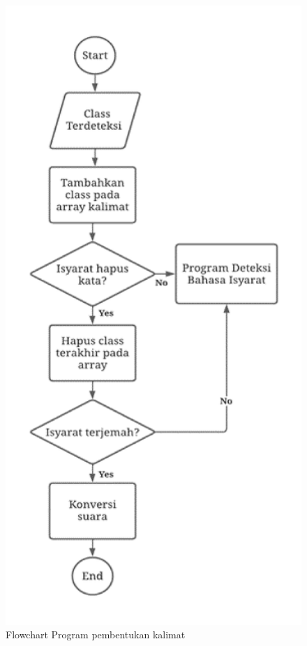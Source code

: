\begin{figure}[H]
  \centering

  \includegraphics[scale=0.3]{gambar/bab3-flowchart-kalimat.png}

  \caption{Flowchart Program pembentukan kalimat}
  \label{fig:flowchartkalimat}
\end{figure}


